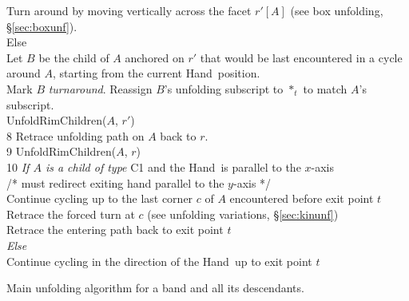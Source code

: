 \documentclass[11pt]{article}
\newcommand\hand{{\sc Hand}}
\newcommand\unfoldrim{{\sc UnfoldRimChildren}}
\begin{document}
\begin{table}[p]
\begin{center}
{\begin{minipage}[h]{0.9\linewidth}
{\begin{tabbing}
  \> \> \> Turn around by moving vertically across the facet $r'[A]$ (see box unfolding, \S\ref{sec:boxunf}). \\
  \>   \> Else \\
  \> \> \> Let $B$ be the child of $A$ anchored on $r'$ that would be last encountered in a cycle \\
  \> \> \> \> around $A$, starting from the current \hand\ position. \\
  \> \> \> Mark $B$ \emph{turnaround}. Reassign $B$'s unfolding subscript to $*_t$ to match $A$'s subscript. \\
  \> \> \> \unfoldrim($A$, $r'$) \\
8 \>   \> Retrace unfolding path on $A$ back to $r$. \\
9 \>   \> \unfoldrim($A$, $r$) \\
10 \> \emph{If $A$ is a child of type} C1 and the \hand\ is parallel to the $x$-axis \\
\> \> /* must redirect exiting hand parallel to the $y$-axis */ \\
   \> \> Continue cycling up to the last corner $c$ of $A$ encountered before exit point $t$ \\
   \> \> Retrace the forced turn at $c$ (see unfolding variations, \S\ref{sec:kinunf})\\
   \> \> Retrace the entering path back to exit point $t$ \\
 \> \emph{Else} \\
   \> \> Continue cycling in the direction of the \hand\ up to exit point $t$ 
\end{tabbing}}
\end{minipage}
}\vspace{1mm}
\end{center}
\vspace{-1em}\caption{Main unfolding algorithm for a band and all its descendants.}
\label{tab:unfoldrims}
\end{table}
\end{document}

